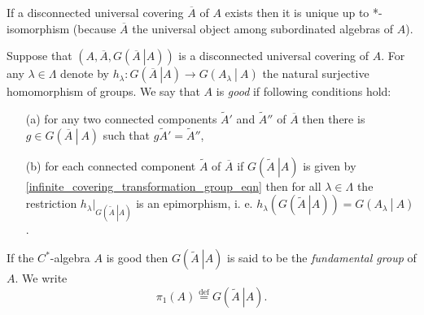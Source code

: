 \documentclass{beamer}
\theoremstyle{plain}
\newcommand{\la}{\lambda}
\newcommand{\La}{\Lambda}
\newcommand{\bydef}{\stackrel{\mathrm{def}}{=}}
\begin{document}
\begin{frame}
\begin{lemma}\label{uni_dicsonnected_lem}
	If a disconnected universal covering $\overline A$ of $A$ exists then it is unique up to *-isomorphism (because $\overline A$ the universal object among subordinated algebras of $A$). 
\end{lemma}

\begin{definition}\label{good_defn}
   Suppose that $\left(A, \overline{A}, G\left(\left.\overline{A}~\right| A\right)\right)$ is a disconnected universal covering of $A$. For any $\la \in \La$ denote by $h_\la: G\left(\left.\overline{A}~\right| A\right) \to G\left(\left. A_\la~\right|~A \right)$ the natural surjective homomorphism of groups.
	We say  that $A$  is \textit{good} if  following conditions hold:
	\begin{enumerate}
		\item[(a)] for any two  {connected components}  $\widetilde{A}'$ and $\widetilde{A}''$  of $\overline A$ then there is  $g \in G\left(\left.\overline{A}~\right|~ A\right)$ such that $g \widetilde{A}'= \widetilde{A}''$,
		\item [(b)] for each connected component $\widetilde A$ of $\overline{A}$ if  $G\left(\left.\widetilde{A}~\right| A\right)$ is given by  \eqref{infinite_covering_transformation_group_eqn} then for all $\la \in \La$ the restriction $h_\la|_{G\left(\left.\widetilde{A}~\right| A\right)}$ is an epimorphism, i. e. $h_\la\left(G\left(\left.\widetilde{A}~\right| A\right) \right) = G\left(\left. A_\la~\right|~A \right)$.
	\end{enumerate}
\end{definition}

\end{frame}
\begin{frame}
	\begin{definition}
	If the $C^*$-algebra 	$A$ is  good then $G\left(\left.\widetilde{A}~\right| A\right)$ is said to be the \textit{fundamental group} of $A$. We write
	$$
\pi_1\left(A \right) \bydef G\left(\left.\widetilde{A}~\right| A\right).	
	$$
	\end{definition}
\end{frame}
\end{document}
